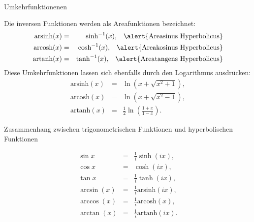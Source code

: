 \documentclass[german]{beamer}
\newcommand{\bq}{\begin{eqnarray*}}
\newcommand{\eq}{\end{eqnarray*}}
\begin{document}
\begin{frame}{Umkehrfunktionenen}

Die inversen Funktionen werden als Areafunktionen bezeichnet:
\bq
 \mbox{arsinh}(x) & = & \sinh^{-1}(x), \;\;\;\alert{\mbox{Areasinus Hyperbolicus}}
 \nonumber \\
 \mbox{arcosh}(x) & = & \cosh^{-1}(x), \;\;\;\alert{\mbox{Areakosinus Hyperbolicus}}
 \nonumber \\
 \mbox{artanh}(x) & = & \tanh^{-1}(x), \;\;\;\alert{\mbox{Areatangens Hyperbolicus}}
\eq
Diese Umkehrfunktionen lassen sich ebenfalls durch den Logarithmus ausdr\"ucken:
\bq
 \mbox{arsinh}(x) & = & \ln\left( x + \sqrt{x^2+1} \right),
 \nonumber \\
 \mbox{arcosh}(x) & = & \ln\left( x + \sqrt{x^2-1} \right),
 \nonumber \\
 \mbox{artanh}(x) & = & \frac{1}{2} \ln\left(\frac{1+x}{1-x}\right).
\eq

\end{frame}

\begin{frame}{Zusammenhang zwischen trigonometrischen Funktionen und hyperbolischen Funktionen}

\bq
 \sin x & = & \frac{1}{i} \sinh\left(i x \right),
 \nonumber \\
 \cos x & = & \cosh\left( i x \right),
 \nonumber \\
 \tan x & = & \frac{1}{i} \tanh\left(i x \right),
 \nonumber \\
 \arcsin(x) & = & \frac{1}{i} \mbox{arsinh}\left(i x \right),
 \nonumber \\
 \arccos(x) & = & \frac{1}{i} \mbox{arcosh}\left(x \right),
 \nonumber \\
 \arctan(x) & = & \frac{1}{i} \mbox{artanh}\left(i x \right).
\eq

\end{frame}
\end{document}
